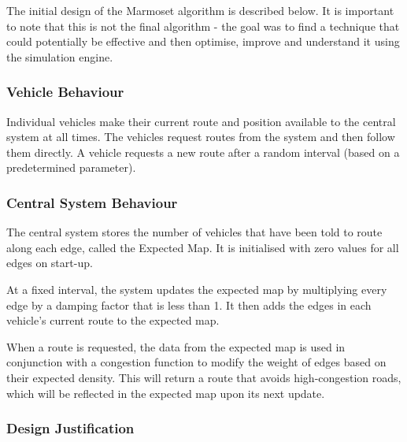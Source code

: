 \documentclass[ %
                    author={Alexander Hill},
                supervisor={Dr. Benjamin Sach},
                    degree={MEng},
                     title={MARMOSET},
                  subtitle={Multi-Agent Route Management using Online Simulation for Efficient Transportation},
                      type={research},
                      year={2016} ]{dissertation}
\begin{document}
The initial design of the Marmoset algorithm is described below. It is
important to note that this is not the final algorithm - the goal was to find a
technique that could potentially be effective and then optimise, improve and
understand it using the simulation engine.

\subsubsection{Vehicle Behaviour}

Individual vehicles make their current route and position available to
the central system at all times. The vehicles request routes from the system and
then follow them directly. A vehicle requests a new route after a random
interval (based on a predetermined parameter).

\subsubsection{Central System Behaviour}

The central system stores the number of vehicles that have been told to route
along each edge, called the Expected Map. It is initialised with zero values for
all edges on start-up.

At a fixed interval, the system updates the expected map by multiplying every
edge by a damping factor that is less than 1. It then adds the edges in each
vehicle's current route to the expected map.

When a route is requested, the data from the expected map is used in conjunction
with a congestion function to modify the weight of edges based on their expected
density. This will return a route that avoids high-congestion roads, which will
be reflected in the expected map upon its next update.

\subsubsection{Design Justification}
\end{document}
